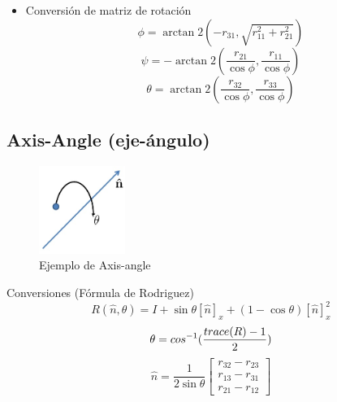 \documentclass[main.tex]{subfiles}
\begin{document}
\begin{itemize}
\item Conversión de matriz de rotación
  \begin{equation}
    \phi=\arctan 2(-r_{31},\sqrt{r_{11}^2+r_{21}^2})
  \end{equation}
  \begin{equation}
    \psi=-\arctan 2(\frac{r_{21}}{\cos\phi},\frac{r_{11}}{\cos\phi})
  \end{equation}
  \begin{equation}
    \theta=\arctan 2(\frac{r_{32}}{\cos\phi},\frac{r_{33}}{\cos\phi})
  \end{equation}
\end{itemize}


\subsection{Axis-Angle (eje-ángulo)}

\begin{figure}[h]
  \centering
  \includegraphics[width=0.25\textwidth]{../img/axisang.jpg}
  \caption{Ejemplo de Axis-angle}
  \label{axisang}
\end{figure}

Conversiones (Fórmula de Rodriguez)
\begin{equation}
  R(\hat{n},\theta) = I +
      \sin\theta\left [ \hat{n} \right ]_{x}
      +(1-\cos\theta)\left [ \hat{n} \right ]_{x}^2
\end{equation}
\begin{equation}
  \theta=\\cos^{-1}(\frac{trace(R)-1}{2})
\end{equation}
\begin{equation}
  \hat{n} = \frac{1}{2\sin\theta}
            \begin{bmatrix}
              r_{32}-r_{23}\\ 
              r_{13}-r_{31}\\ 
              r_{21}-r_{12}
            \end{bmatrix}
\end{equation}
\end{document}
